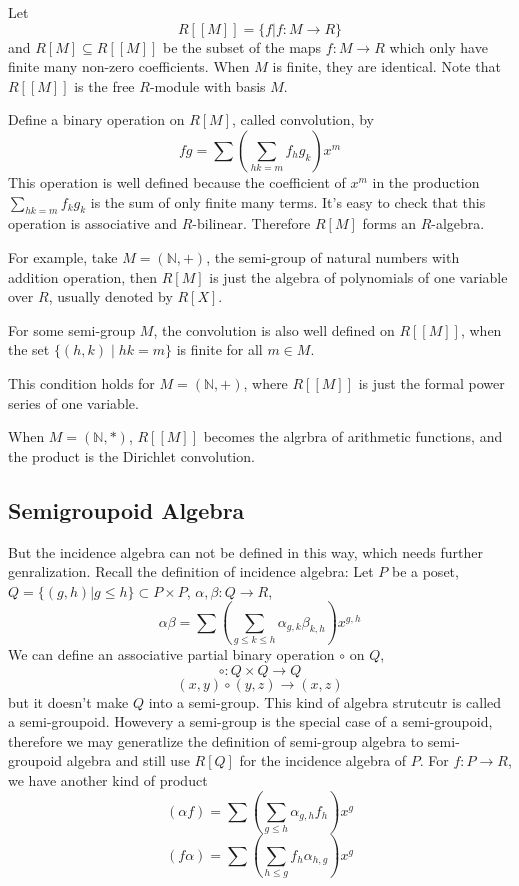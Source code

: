 \documentclass{article}
\begin{document}
Let $$R[[M]] = \{f \vert f : M \to R\}$$ and $R[M] \subseteq R[[M]]$ be the subset
of the maps $f : M \to R$ which only have finite many non-zero coefficients.
When $M$ is finite, they are identical.
Note that $R[[M]]$ is the free $R$-module with basis $M$.

Define a binary operation on $R[M]$, called convolution, by
$$fg = \sum (\sum_{hk = m} f_h g_k) x^m$$
This operation is well defined because the coefficient of $x^m$ in the production $\sum_{hk=m} f_k g_k$
is the sum of only finite many terms. It's easy to check that this operation is associative and $R$-bilinear.
Therefore $R[M]$ forms an $R$-algebra.

For example, take $M = (\mathbb N, +)$, the semi-group of natural numbers with addition operation,
then $R[M]$ is just the algebra of polynomials of one variable over $R$, usually denoted by $R[X]$.

For some semi-group $M$, the convolution is also well defined on $R[[M]]$,
when the set $\{(h, k) \mid hk = m\}$ is finite for all $m \in M$.

This condition holds for $M = (\mathbb N, +)$, where $R[[M]]$ is just the formal power series of one variable.

When $M = (\mathbb N, \ast)$, $R[[M]]$ becomes the algrbra of arithmetic functions,
and the product is the Dirichlet convolution.

\subsection{Semigroupoid Algebra}
But the incidence algebra can not be defined in this way, which needs further genralization.
Recall the definition of incidence algebra:
Let $P$ be a poset, $Q = \{(g, h) \vert g \leq h\} \subset P \times P$,
$\alpha, \beta : Q \to R$,
$$\alpha\beta = \sum (\sum_{g\leq k \leq h} \alpha_{g,k} \beta_{k,h})x^{g,h}$$
We can define an associative partial binary operation $\circ$ on $Q$,
$$\circ : Q \times Q \to Q$$
$$(x, y) \circ (y, z) \to (x, z)$$
but it doesn't make $Q$ into a semi-group.
This kind of algebra strutcutr is called a semi-groupoid.
Howevery a semi-group is the special case of a semi-groupoid,
therefore we may generatlize the definition of semi-group algebra
to semi-groupoid algebra and still use $R[Q]$ for the incidence algebra of $P$.
For $f : P \to R$, we have another kind of product
$$(\alpha f) = \sum (\sum_{g\leq h} \alpha_{g, h} f_h)x^g$$
$$(f \alpha) = \sum (\sum_{h\leq g} f_h \alpha_{h, g})x^g$$
\end{document}

